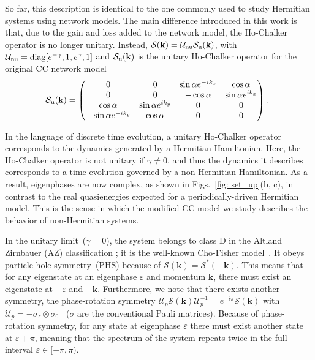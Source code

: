 \documentclass[aps,pra,reprint,superscriptaddress,showkeys,amsmath,amssymb,longbibliography]{revtex4-1}
\begin{document}
So far, this description is identical to the one commonly used to study Hermitian systems using network models.
The main difference introduced in this work is that, due to the gain and loss added to the network model, the Ho-Chalker operator is no longer unitary.
Instead, $\mathcal{S}(\textbf{k})=\mathcal{U}_{\rm nu}\mathcal{S}_{\rm u}(\textbf{k})$, with $\mathcal{U}_{\rm nu}=\text{diag}[e^{-\gamma},1,e^{\gamma},1]$ and $\mathcal{S}_{\rm u}(\textbf{k})$ is the unitary Ho-Chalker operator for the original CC network model
\begin{eqnarray}
\hspace{-2mm}\mathcal{S}_{\rm u}(\textbf{k})=\begin{pmatrix}0&0&\sin\alpha e^{-ik_x}&\cos\alpha\\0&0&-\cos\alpha&\sin\alpha e^{ik_x}\\\cos\alpha&\sin\alpha e^{ik_y}&0&0\\-\sin\alpha e^{-i k_y}&\cos\alpha&0&0\end{pmatrix}.\nonumber\\
\label{eq: ho_chalker_operator}
\end{eqnarray}

In the language of discrete time evolution, a unitary Ho-Chalker operator corresponds to the dynamics generated by a Hermitian Hamiltonian.
Here, the Ho-Chalker operator is not unitary if $\gamma\neq 0$, and thus the dynamics it describes corresponds to a time evolution governed by a non-Hermitian Hamiltonian.
As a result, eigenphases are now complex, as shown in Figs.~\ref{fig: set_up}(b, c), in contrast to the real quasienergies expected for a periodically-driven Hermitian model.
This is the sense in which the modified CC model we study describes the behavior of non-Hermitian systems.

In the unitary limit~($\gamma=0$), the system belongs to class D in the Altland Zirnbauer (AZ) classification \cite{Altland1997}; it is the well-known Cho-Fisher model~\cite{Cho_Fisher}.
It obeys particle-hole symmetry~(PHS) because of $\mathcal{S}(\textbf{k})=\mathcal{S}^{*}(-\textbf{k})$.
This means that for any eigenstate at an eigenphase $\varepsilon$ and momentum $\textbf{k}$, there must exist an eigenstate at $-\varepsilon$ and $-\textbf{k}$.
Furthermore, we note that there exists another symmetry, the phase-rotation symmetry $\mathcal{U}_p\mathcal{S}(\textbf{k})\mathcal{U}_p^{-1}=e^{-i\pi}\mathcal{S}(\textbf{k})$ with $\mathcal{U}_p=-\sigma_z\otimes \sigma_0$~\cite{Delplace2017} ($\sigma$ are the conventional Pauli matrices).
Because of phase-rotation symmetry, for any state at eigenphase $\varepsilon$ there must exist another state at $\varepsilon+\pi$, meaning that the spectrum of the system repeats twice in the full interval $\varepsilon\in[-\pi,\pi)$.
\end{document}
